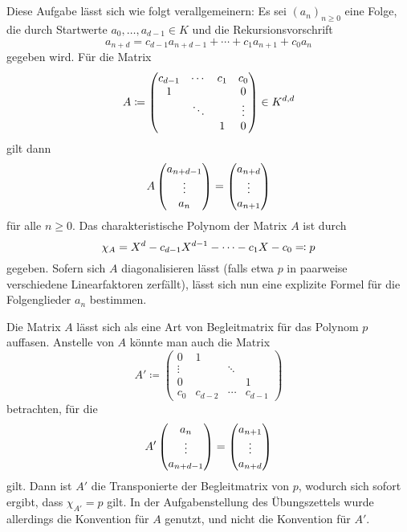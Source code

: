 \section{}

Diese Aufgabe lässt sich wie folgt verallgemeinern:
Es sei $(a_n)_{n \geq 0}$ eine Folge, die durch Startwerte $a_0, \dotsc, a_{d-1} \in K$ und die Rekursionsvorschrift
\[
    a_{n+d}
  = c_{d-1} a_{n+d-1} + \dotsb + c_1 a_{n+1} + c_0 a_{n}
\]
gegeben wird.
Für die Matrix
\[
            A
  \coloneqq \begin{pmatrix}
              c_{d-1} & \cdots  & c_1 & c_0     \\
              1       &         &     & 0       \\
                      & \ddots  &     & \vdots  \\
                      &         & 1   & 0
            \end{pmatrix}
  \in       \matrices{d}{K}
\]
gilt dann
\[
    A \columnvector{a_{n+d-1} \\ \vdots \\ a_n}
  =   \columnvector{a_{n+d} \\ \vdots \\ a_{n+1}}
\]
für alle $n \geq 0$.
Das charakteristische Polynom der Matrix $A$ ist durch
\[
              \charpol{A}
  =           X^d - c_{d-1} X^{d-1} - \dotsb - c_1 X - c_0
  \definedas  p
\]
gegeben.
Sofern sich $A$ diagonalisieren lässt (falls etwa $p$ in paarweise verschiedene Linearfaktoren zerfällt), lässt sich nun eine explizite Formel für die Folgenglieder $a_n$ bestimmen.

\begin{remark}
  Die Matrix $A$ lässt sich als eine Art von Begleitmatrix für das Polynom $p$ auffasen.
  Anstelle von $A$ könnte man auch die Matrix
  \[
              A'
    \coloneqq \begin{pmatrix}
                0       & 1       &         &         \\
                \vdots  &         & \ddots  &         \\
                0       &         &         & 1       \\
                c_0     & c_{d-2} & \cdots  & c_{d-1}
              \end{pmatrix}
  \]
  betrachten, für die
  \[
      A' \columnvector{a_n \\ \vdots \\ a_{n+d-1}}
    =    \columnvector{a_{n+1} \\ \vdots \\ a_{n+d}}
  \]
  gilt.
  Dann ist $A'$ die Transponierte der Begleitmatrix von $p$, wodurch sich sofort ergibt, dass $\chi_{A'} = p$ gilt.
  In der Aufgabenstellung des Übungszettels wurde allerdings die Konvention für $A$ genutzt, und nicht die Konvention für $A'$.
\end{remark}


